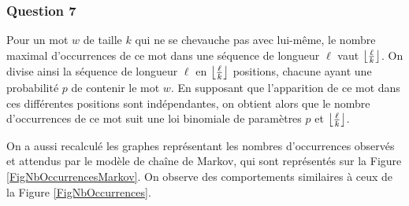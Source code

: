 \documentclass[a4paper,12pt]{article}
\DeclarePairedDelimiter{\floor}{\lfloor}{\rfloor}
\begin{document}
\subsubsection*{Question 7}

Pour un mot $w$ de taille $k$ qui ne se chevauche pas avec lui-même, le nombre maximal d'occurrences de ce mot dans une séquence de longueur $\ell$ vaut $\floor*{\frac{\ell}{k}}$. On divise ainsi la séquence de longueur $\ell$ en $\floor*{\frac{\ell}{k}}$ positions, chacune ayant une probabilité $p$ de contenir le mot $w$. En supposant que l'apparition de ce mot dans ces différentes positions sont indépendantes, on obtient alors que le nombre d'occurrences de ce mot suit une loi binomiale de paramètres $p$ et $\floor*{\frac{\ell}{k}}$.

On a aussi recalculé les graphes représentant les nombres d'occurrences observés et attendus par le modèle de chaîne de Markov, qui sont représentés sur la Figure \ref{FigNbOccurrencesMarkov}. On observe des comportements similaires à ceux de la Figure \ref{FigNbOccurrences}.
\end{document}
